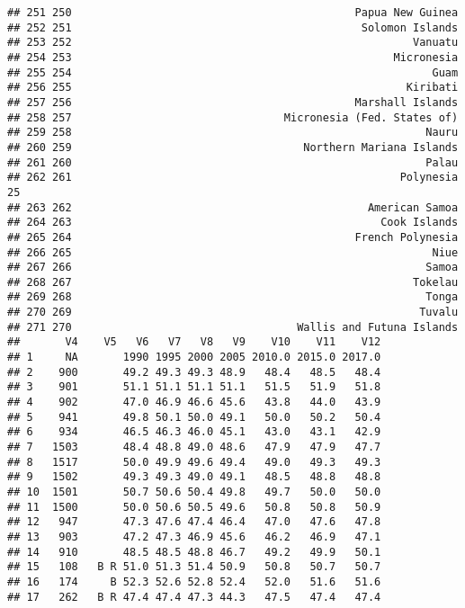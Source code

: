 \documentclass[]{article}
\begin{document}
\begin{verbatim}
## 251 250                                            Papua New Guinea   
## 252 251                                             Solomon Islands   
## 253 252                                                     Vanuatu   
## 254 253                                                  Micronesia   
## 255 254                                                        Guam   
## 256 255                                                    Kiribati   
## 257 256                                            Marshall Islands   
## 258 257                                 Micronesia (Fed. States of)   
## 259 258                                                       Nauru   
## 260 259                                    Northern Mariana Islands   
## 261 260                                                       Palau   
## 262 261                                                   Polynesia 25
## 263 262                                              American Samoa   
## 264 263                                                Cook Islands   
## 265 264                                            French Polynesia   
## 266 265                                                        Niue   
## 267 266                                                       Samoa   
## 268 267                                                     Tokelau   
## 269 268                                                       Tonga   
## 270 269                                                      Tuvalu   
## 271 270                                   Wallis and Futuna Islands   
##       V4    V5   V6   V7   V8   V9    V10    V11    V12
## 1     NA       1990 1995 2000 2005 2010.0 2015.0 2017.0
## 2    900       49.2 49.3 49.3 48.9   48.4   48.5   48.4
## 3    901       51.1 51.1 51.1 51.1   51.5   51.9   51.8
## 4    902       47.0 46.9 46.6 45.6   43.8   44.0   43.9
## 5    941       49.8 50.1 50.0 49.1   50.0   50.2   50.4
## 6    934       46.5 46.3 46.0 45.1   43.0   43.1   42.9
## 7   1503       48.4 48.8 49.0 48.6   47.9   47.9   47.7
## 8   1517       50.0 49.9 49.6 49.4   49.0   49.3   49.3
## 9   1502       49.3 49.3 49.0 49.1   48.5   48.8   48.8
## 10  1501       50.7 50.6 50.4 49.8   49.7   50.0   50.0
## 11  1500       50.0 50.6 50.5 49.6   50.8   50.8   50.9
## 12   947       47.3 47.6 47.4 46.4   47.0   47.6   47.8
## 13   903       47.2 47.3 46.9 45.6   46.2   46.9   47.1
## 14   910       48.5 48.5 48.8 46.7   49.2   49.9   50.1
## 15   108   B R 51.0 51.3 51.4 50.9   50.8   50.7   50.7
## 16   174     B 52.3 52.6 52.8 52.4   52.0   51.6   51.6
## 17   262   B R 47.4 47.4 47.3 44.3   47.5   47.4   47.4

\end{verbatim}
\end{document}
